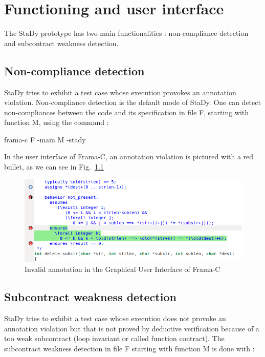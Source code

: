 \documentclass[web]{frama-c-book}
\begin{document}

\chapter{Functioning and user interface}

The StaDy prototype has two main functionalities : non-compliance detection and subcontract weakness detection.

\section{Non-compliance detection}

StaDy tries to exhibit a test case whose execution provokes an annotation violation. Non-compliance detection is the default mode of StaDy. One can detect non-compliances between the code and its specification in file F, starting with function M, using the command :

\begin{shell}
frama-c F -main M -stady
\end{shell}

In the user interface of Frama-C, an annotation violation is pictured with a red bullet, as we can see in Fig.~\ref{fig:gui}

\begin{figure}\centering
  \includegraphics[scale=.4]{ppt_invalid.png}
  \caption{Invalid annotation in the Graphical User Interface of Frama-C
    \label{fig:gui}}
\end{figure}

\section{Subcontract weakness detection}

StaDy tries to exhibit a test case whose execution does not provoke an annotation violation but that is not proved by deductive verification because of a too weak subcontract (loop invariant or called function contract). The subcontract weakness detection in file F starting with function M is done with :
\end{document}
